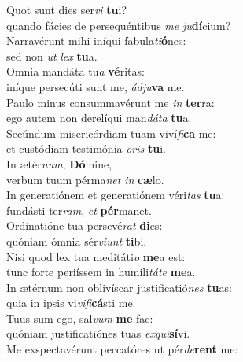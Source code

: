 \evenverse Quot sunt dies ser\textit{vi} \textbf{tu}i?~\*\\
\evenverse quando fácies de persequéntibus \textit{me} \textit{ju}\textbf{dí}cium?\\
\oddverse Narravérunt mihi iníqui fabula\textit{ti}\textbf{ó}nes:~\*\\
\oddverse sed non \textit{ut} \textit{lex} \textbf{tu}a.\\
\evenverse Omnia mandáta tu\textit{a} \textbf{vé}ritas:~\*\\
\evenverse iníque persecúti sunt me, \textit{ád}\textit{ju}\textbf{va} me.\\
\oddverse Paulo minus consummavérunt me \textit{in} \textbf{ter}ra:~\*\\
\oddverse ego autem non derelíqui man\textit{dá}\textit{ta} \textbf{tu}a.\\
\evenverse Secúndum misericórdiam tuam viví\textit{fi}\textbf{ca} me:~\*\\
\evenverse et custódiam testimónia \textit{o}\textit{ris} \textbf{tu}i.\\
\oddverse In ætér\textit{num}, \textbf{Dó}mine,~\*\\
\oddverse verbum tuum pérma\textit{net} \textit{in} \textbf{cæ}lo.\\
\evenverse In generatiónem et generatiónem véri\textit{tas} \textbf{tu}a:~\*\\
\evenverse fundásti ter\textit{ram}, \textit{et} \textbf{pér}manet.\\
\oddverse Ordinatióne tua persevé\textit{rat} \textbf{di}es:~\*\\
\oddverse quóniam ómnia sér\textit{vi}\textit{unt} \textbf{ti}bi.\\
\evenverse Nisi quod lex tua meditáti\textit{o} \textbf{me}a est:~\*\\
\evenverse tunc forte periíssem in humili\textit{tá}\textit{te} \textbf{me}a.\\
\oddverse In ætérnum non oblivíscar justificatió\textit{nes} \textbf{tu}as:~\*\\
\oddverse quia in ipsis vi\textit{vi}\textit{fi}\textbf{cá}sti me.\\
\evenverse Tuus sum ego, sal\textit{vum} \textbf{me} fac:~\*\\
\evenverse quóniam justificatiónes tuas \textit{ex}\textit{qui}\textbf{sí}vi.\\
\oddverse Me exspectavérunt peccatóres ut pér\textit{de}\textbf{rent} me:~\*\\
